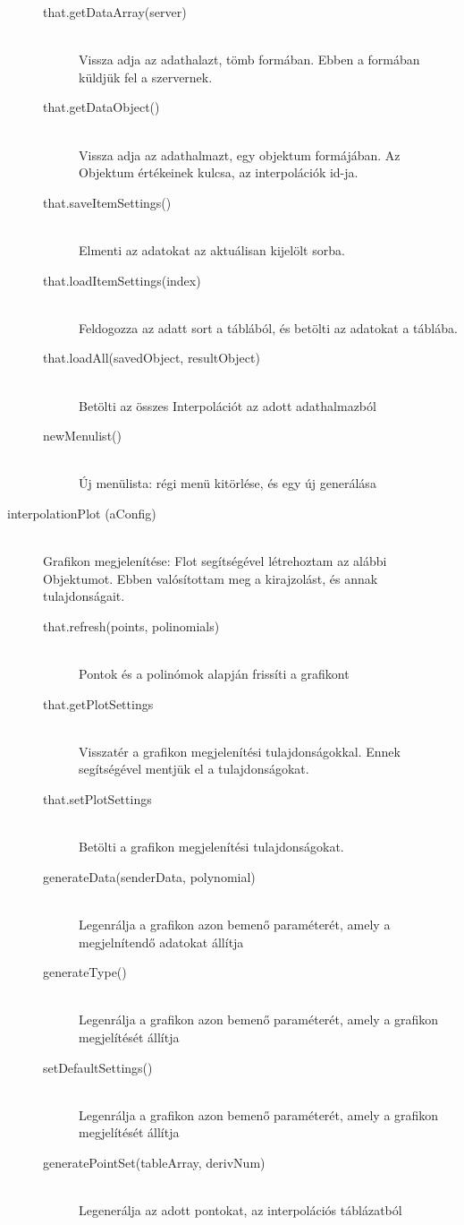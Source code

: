 \documentclass{elteikthesis}
\begin{document}
\begin{description}
\begin{description}
			\item[that.getDataArray(server)] 
			\hfill \\ Vissza adja az adathalazt, tömb formában. Ebben a formában küldjük fel a szervernek.
			\item[that.getDataObject()] 
			\hfill \\ Vissza adja az adathalmazt, egy objektum formájában. Az Objektum értékeinek kulcsa, az interpolációk id-ja.
			\item[that.saveItemSettings()] 
			\hfill \\ Elmenti az adatokat az aktuálisan kijelölt sorba.
			\item[that.loadItemSettings(index)]
			\hfill \\ Feldogozza az adatt sort a táblából, és betölti az adatokat a táblába.
			\item[that.loadAll(savedObject, resultObject)] 
			\hfill \\Betölti az összes Interpolációt az adott adathalmazból
			\item[newMenulist()] 
			\hfill \\
			Új menülista: régi menü kitörlése, és egy új generálása
			\hfill \\ 
			\end{description}
		\item[interpolationPlot (aConfig)]
			\hfill \\ Grafikon megjelenítése: Flot segítségével létrehoztam az alábbi Objektumot. Ebben valósítottam meg a kirajzolást, és annak tulajdonságait.
			\begin{description}
			\item[that.refresh(points, polinomials)]
			\hfill \\ Pontok és a polinómok alapján frissíti a grafikont
			\item[that.getPlotSettings]
			\hfill \\ Visszatér a grafikon megjelenítési tulajdonságokkal. Ennek segítségével mentjük el a tulajdonságokat.
			\item[that.setPlotSettings]
			\hfill \\ Betölti a grafikon megjelenítési tulajdonságokat.
			\item[generateData(senderData, polynomial)]
			\hfill \\ Legenrálja a grafikon azon bemenő paraméterét, amely a megjelnítendő adatokat állítja
			\item[generateType()]
			\hfill \\ Legenrálja a grafikon azon bemenő paraméterét, amely a grafikon megjelítését állítja
			\item[setDefaultSettings()]
			\hfill \\ Legenrálja a grafikon azon bemenő paraméterét, amely a grafikon megjelítését állítja
			\item[generatePointSet(tableArray, derivNum)]
			\hfill \\ Legenerálja az adott pontokat, az interpolációs táblázatból
			\end{description}


\end{description}
\end{document}
